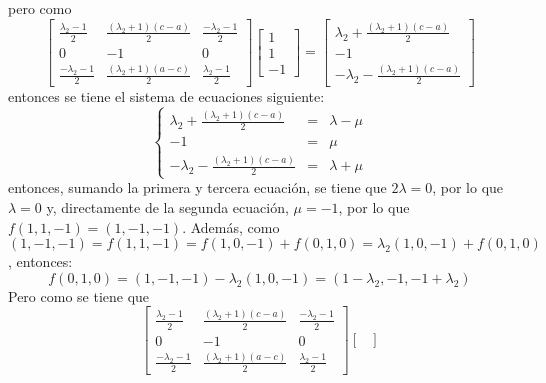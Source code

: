 \begin{solucion}
\begin{enumerate}[$a$)]
  pero como 
  \begin{equation*}
   \begin{bmatrix}
    \frac{\lambda_2 - 1}{2} & \frac{(\lambda_2+1)(c-a)}{2} & \frac{-\lambda_2-1}{2} \\
    0 & -1 & 0 \\
    \frac{-\lambda_2-1}{2} & \frac{(\lambda_2+1)(a-c)}{2} & \frac{\lambda_2 - 1}{2}
   \end{bmatrix}
   \begin{bmatrix}
    1 \\ 1 \\ -1
   \end{bmatrix}
   =
   \begin{bmatrix}
    \lambda_2 + \frac{(\lambda_2+1)(c-a)}{2} \\
    -1 \\
    -\lambda_2 - \frac{(\lambda_2+1)(c-a)}{2}
   \end{bmatrix}
  \end{equation*}
  entonces se tiene el sistema de ecuaciones siguiente:
  \begin{equation*}
   \left\{
   \begin{matrix}
    \lambda_2 + \frac{(\lambda_2+1)(c-a)}{2} & = & \lambda - \mu \\
    -1 & = & \mu \\
    -\lambda_2 - \frac{(\lambda_2+1)(c-a)}{2} & = & \lambda + \mu
   \end{matrix}
   \right.
  \end{equation*}
  entonces, sumando la primera y tercera ecuaci\'on, se tiene que $2\lambda = 0$, por lo que $\lambda = 0$ y, directamente de la segunda ecuaci\'on, $\mu = -1$, por lo que $f(1,1,-1) = (1,-1,-1)$. Adem\'as, como $(1,-1,-1) = f(1,1,-1) = f(1,0,-1) + f(0,1,0) = \lambda_2(1, 0, -1) + f(0,1,0)$, entonces:
  \begin{equation*}
   f(0,1,0) = (1,-1,-1) - \lambda_2(1,0,-1) = (1-\lambda_2, -1, -1+\lambda_2)
  \end{equation*}
  Pero como se tiene que 
  \begin{equation*}
   \begin{bmatrix}
    \frac{\lambda_2 - 1}{2} & \frac{(\lambda_2+1)(c-a)}{2} & \frac{-\lambda_2-1}{2} \\
    0 & -1 & 0 \\
    \frac{-\lambda_2-1}{2} & \frac{(\lambda_2+1)(a-c)}{2} & \frac{\lambda_2 - 1}{2}
   \end{bmatrix}
   \begin{bmatrix}

\end{bmatrix}
\end{equation*}
\end{enumerate}
\end{solucion}
